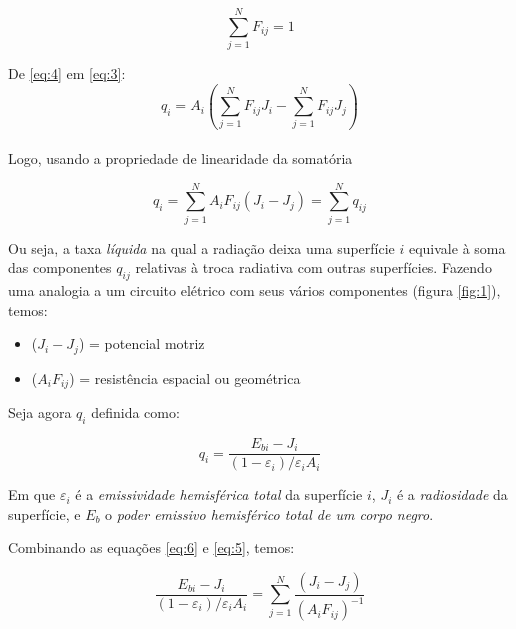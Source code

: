 \begin{equation}
\sum _{j=1}^{N}{F_{ij}} = 1
\label{eq:4}
\end{equation}

De \ref{eq:4} em \ref{eq:3}:
\[
q_{i}=A_{i}\left(  \sum _{j=1}^{N}{F_{ij}}J_{i} - \sum _{j=1}^{N}{F_{ij}J_{j}}  \right)
\]
\\
Logo, usando a propriedade de linearidade da somatória

\begin{equation}
q_{i}=\sum _{j=1}^{N}{A_{i}F_{ij}(  J_{i} - J_{j}  )} = \sum _{j=1}^{N}q_{ij}
\label{eq:5}
\end{equation}

Ou seja, a taxa \textit{líquida} na qual a radiação deixa uma superfície $i$ equivale à soma das componentes $q_{ij}$ relativas à troca radiativa com outras superfícies. Fazendo uma analogia a um circuito elétrico com seus vários componentes (figura \ref{fig:1}), temos:

\begin{itemize}
\item ($J_{i}-J_{j}$) = potencial motriz
\item ($A_{i}F_{ij}$) = resistência espacial ou geométrica
\end{itemize}



Seja agora $q_{i}$ definida como:

\begin{equation}
q_{i}=\frac{E_{bi}-J_{i}}{(1-\varepsilon _{i})/\varepsilon _{i}A_{i}}
\label{eq:6}
\end{equation}

Em que $\varepsilon _{i}$ é a \textit{emissividade hemisférica total} da superfície $i$, $J_{i}$ é a \textit{radiosidade} da superfície, e $E_{b}$ o \textit{poder emissivo hemisférico total de um corpo negro}.

Combinando as equações \ref{eq:6} e \ref{eq:5}, temos:

\begin{equation}
\frac{E_{bi}-J_{i}}{(1-\varepsilon _{i})/ \varepsilon _{i}A_{i}} = \sum _{j=1}^{N} \frac{(  J_{i} - J_{j}  )} {(A_{i}F_{ij})^{-1}}
\label{eq:7}
\end{equation}


